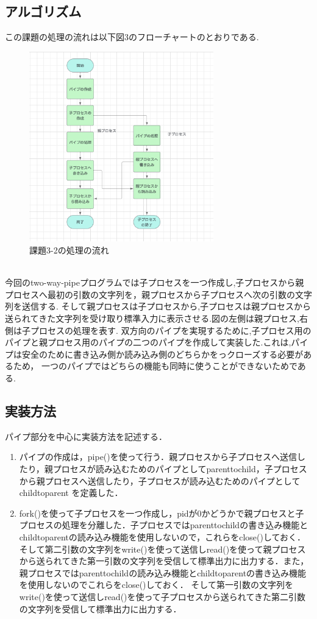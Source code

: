 \documentclass[dvipdfmx]{jarticle}
\begin{document}
\subsection{アルゴリズム}
この課題の処理の流れは以下図3のフローチャートのとおりである.
\begin{figure}[h]
    \centering
    \includegraphics[width=8cm]{3-2hurotya.png}
    \caption{課題3-2の処理の流れ}
\end{figure}
\\
今回のtwo-way-pipeプログラムでは子プロセスを一つ作成し,子プロセスから親プロセスへ最初の引数の文字列を，親プロセスから子プロセスへ次の引数の文字列を送信する.
そして親プロセスは子プロセスから,子プロセスは親プロセスから送られてきた文字列を受け取り標準入力に表示させる.図の左側は親プロセス,右側は子プロセスの処理を表す.
双方向のパイプを実現するために,子プロセス用のパイプと親プロセス用のパイプの二つのパイプを作成して実装した.これは,パイプは安全のために書き込み側か読み込み側のどちらかをっクローズする必要があるため，
一つのパイプではどちらの機能も同時に使うことができないためである.
\subsection{実装方法}
パイプ部分を中心に実装方法を記述する．
\begin{enumerate}
    \item パイプの作成は，pipe()を使って行う．親プロセスから子プロセスへ送信したり，親プロセスが読み込むためのパイプとしてparenttochild，子プロセスから親プロセスへ送信したり，子プロセスが読み込むためのパイプとしてchildtoparent
    を定義した．
    \item fork()を使って子プロセスを一つ作成し，pidが0かどうかで親プロセスと子プロセスの処理を分離した．子プロセスではparenttochildの書き込み機能とchildtoparentの読み込み機能を使用しないので，これらをclose()しておく．
    そして第二引数の文字列をwrite()を使って送信しread()を使って親プロセスから送られてきた第一引数の文字列を受信して標準出力に出力する．また，親プロセスではparenttochildの読み込み機能とchildtoparentの書き込み機能を使用しないのでこれらをclose()しておく．
    そして第一引数の文字列をwrite()を使って送信しread()を使って子プロセスから送られてきた第二引数の文字列を受信して標準出力に出力する．
\end{enumerate}
\end{document}
